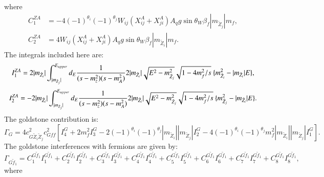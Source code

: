 \documentclass[final,3p,times,pdflatex]{elsarticle}
\begin{document}
where
\begin{align}
C_{1}^{Z A} &= -4(-1)^{\theta_i}(-1)^{\theta_j}W_{ij}(X_{ij}^A + X_{ji}^A)A_{q}g\sin\theta_W \beta_{f} |m_{\tilde{Z}_j}|m_{f}, \\
C_{2}^{Z A} &= 4W_{ij}(X_{ij}^A + X_{ji}^A)A_{q}g\sin\theta_W \beta_{f} |m_{\tilde{Z}_i}|m_{f}.
\end{align}
The integrals included here are:
\begin{equation}
I_{1}^{Z A} = 2|m_{\tilde{Z}_i}|\int_{|m_{\tilde{Z}_j}|}^{E_{upper}} d_{E} {1 \over (s-m_{z}^2)(s-m_{A}^2)}2|m_{\tilde{Z}_i}|\sqrt{E^2-m_{\tilde{Z}_j}^2} \sqrt{1-4m_{f}^2/s} \ \{m_{\tilde{Z}_i}^2 - |m_{\tilde{Z}_i}|E\},
\end{equation}
\begin{equation}
I_{2}^{Z A} = -2|m_{\tilde{Z}_i}|\int_{|m_{\tilde{Z}_j}|}^{E_{upper}} d_{E} {1 \over (s-m_{z}^2)(s-m_{A}^2)}2|m_{\tilde{Z}_i}|\sqrt{E^2-m_{\tilde{Z}_j}^2} \sqrt{1-4m_{f}^2/s} \ \{m_{\tilde{Z}_j}^2 - |m_{\tilde{Z}_i}|E\}.
\end{equation}
The goldstone contribution is:
\begin{equation}
\Gamma_{G} = 4 c_{G \tilde{Z}_i \tilde{Z}_j}^2 c_{G f f}^2\left[I_{4}^G + 2m_{f}^2 I_{3}^G - 2(-1)^{\theta_i}(-1)^{\theta_j}|m_{\tilde{Z}_i}||m_{\tilde{Z}_j}|I_{2}^G - 4(-1)^{\theta_i}(-1)^{\theta_j}m_{f}^2 |m_{\tilde{Z}_i}||m_{\tilde{Z}_j}|I_{1}^G\right].
\end{equation}
The goldstone interferences with fermions are given by:
\begin{equation}
\Gamma_{G \tilde{f}_1} = C_{1}^{G \tilde{f}_1} I_{1}^{G \tilde{f}_1} + C_{2}^{G \tilde{f}_1} I_{2}^{G \tilde{f}_1} + C_{3}^{G \tilde{f}_1} I_{3}^{G \tilde{f}_1} + C_{4}^{G \tilde{f}_1} I_{4}^{G \tilde{f}_1} + C_{5}^{G \tilde{f}_1} I_{5}^{G \tilde{f}_1} + C_{6}^{G \tilde{f}_1} I_{6}^{G \tilde{f}_1} + C_{7}^{G \tilde{f}_1} I_{7}^{G \tilde{f}_1} + C_{8}^{G \tilde{f}_1} I_{8}^{G \tilde{f}_1},
\end{equation}
where
\end{document}
